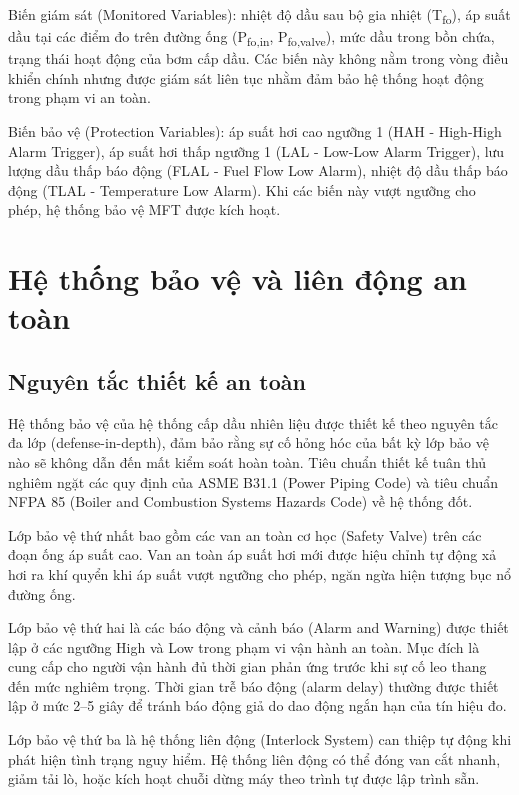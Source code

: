 \documentclass[../main.tex]{subfiles}
\begin{document}
Biến giám sát (Monitored Variables): nhiệt độ dầu sau bộ gia nhiệt (T\textsubscript{fo}), áp suất dầu tại các điểm đo trên đường ống (P\textsubscript{fo,in}, P\textsubscript{fo,valve}), mức dầu trong bồn chứa, trạng thái hoạt động của bơm cấp dầu. Các biến này không nằm trong vòng điều khiển chính nhưng được giám sát liên tục nhằm đảm bảo hệ thống hoạt động trong phạm vi an toàn.

Biến bảo vệ (Protection Variables): áp suất hơi cao ngưỡng 1 (HAH - High-High Alarm Trigger), áp suất hơi thấp ngưỡng 1 (LAL - Low-Low Alarm Trigger), lưu lượng dầu thấp báo động (FLAL - Fuel Flow Low Alarm), nhiệt độ dầu thấp báo động (TLAL - Temperature Low Alarm). Khi các biến này vượt ngưỡng cho phép, hệ thống bảo vệ MFT được kích hoạt.

\section{Hệ thống bảo vệ và liên động an toàn}

\subsection{Nguyên tắc thiết kế an toàn}

Hệ thống bảo vệ của hệ thống cấp dầu nhiên liệu được thiết kế theo nguyên tắc đa lớp (defense-in-depth), đảm bảo rằng sự cố hỏng hóc của bất kỳ lớp bảo vệ nào sẽ không dẫn đến mất kiểm soát hoàn toàn. Tiêu chuẩn thiết kế tuân thủ nghiêm ngặt các quy định của ASME B31.1 (Power Piping Code) và tiêu chuẩn NFPA 85 (Boiler and Combustion Systems Hazards Code) về hệ thống đốt.

Lớp bảo vệ thứ nhất bao gồm các van an toàn cơ học (Safety Valve) trên các đoạn ống áp suất cao. Van an toàn áp suất hơi mới được hiệu chỉnh tự động xả hơi ra khí quyển khi áp suất vượt ngưỡng cho phép, ngăn ngừa hiện tượng bục nổ đường ống.

Lớp bảo vệ thứ hai là các báo động và cảnh báo (Alarm and Warning) được thiết lập ở các ngưỡng High và Low trong phạm vi vận hành an toàn. Mục đích là cung cấp cho người vận hành đủ thời gian phản ứng trước khi sự cố leo thang đến mức nghiêm trọng. Thời gian trễ báo động (alarm delay) thường được thiết lập ở mức 2--5 giây để tránh báo động giả do dao động ngắn hạn của tín hiệu đo.

Lớp bảo vệ thứ ba là hệ thống liên động (Interlock System) can thiệp tự động khi phát hiện tình trạng nguy hiểm. Hệ thống liên động có thể đóng van cắt nhanh, giảm tải lò, hoặc kích hoạt chuỗi dừng máy theo trình tự được lập trình sẵn.
\end{document}
